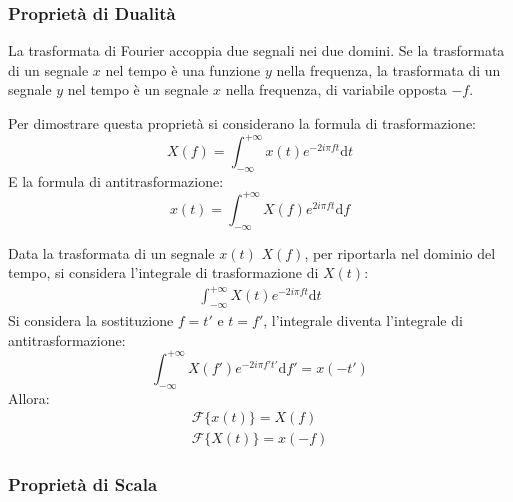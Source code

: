 \documentclass{article}
\newcommand{\df}{\mathrm{d}}
\numberwithin{equation}{subsection}
\begin{document}
\subsubsection{Proprietà di Dualità}

La trasformata di Fourier accoppia due segnali nei due domini. Se la trasformata di un segnale $x$ nel tempo è una funzione $y$ nella frequenza, la trasformata di un segnale $y$ 
nel tempo è un segnale $x$ nella frequenza, di variabile opposta $-f$.

Per dimostrare questa proprietà si considerano la formula di trasformazione:
\begin{equation*}
    X(f)=\displaystyle\int_{-\infty}^{+\infty}x(t)e^{-2i\pi ft}\df t
\end{equation*}
E la formula di antitrasformazione:
\begin{equation*}
    x(t)=\displaystyle\int_{-\infty}^{+\infty}X(f)e^{2i\pi ft}\df f
\end{equation*}

Data la trasformata di un segnale $x(t)$ $X(f)$, per riportarla nel dominio del tempo, si considera l'integrale di trasformazione di $X(t)$:
\begin{gather*}
    \displaystyle\int_{-\infty}^{+\infty}X(t)e^{-2i\pi ft}\df t
\end{gather*}
Si considera la sostituzione $f=t'$ e $t=f'$, l'integrale diventa l'integrale di antitrasformazione:
\begin{equation*}
    \displaystyle\int_{-\infty}^{+\infty}X(f')e^{-2i\pi f't'}\df f'=x(-t')
\end{equation*}
Allora:
\begin{gather}
    \mathscr{F}\{x(t)\}= X(f)\\
    \mathscr{F}\{X(t)\}=x(-f)
\end{gather}

\subsubsection{Proprietà di Scala}
\end{document}

